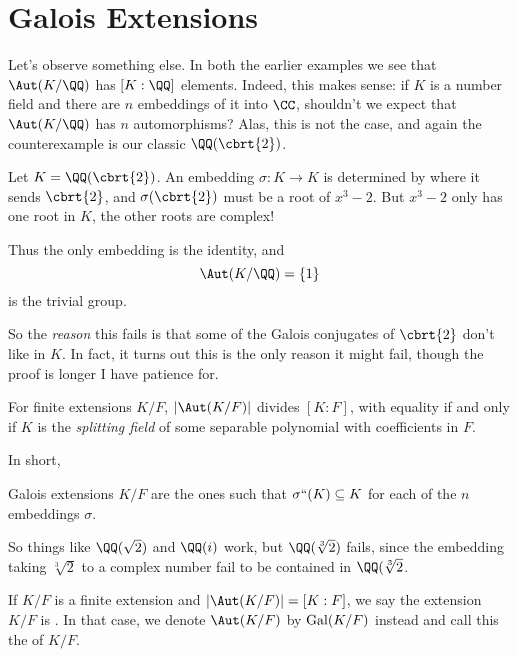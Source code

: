 \section{Galois Extensions}
Let's observe something else.
In both the earlier examples we see that $\Aut(K/\QQ)$ has $[K : \QQ]$ elements.
Indeed, this makes sense: if $K$ is a number field and there are $n$ embeddings of it into $\CC$,
shouldn't we expect that $\Aut(K/\QQ)$ has $n$ automorphisms?
Alas, this is not the case, and again the counterexample is our classic $\QQ(\cbrt{2})$.
\begin{example}
	Let $K = \QQ(\cbrt{2})$.
	An embedding $\sigma : K \to K$ is determined by where it sends $\cbrt{2}$,
	and $\sigma(\cbrt{2})$ must be a root of $x^3-2$.
	But $x^3-2$ only has one root in $K$,
	the other roots are complex!

	Thus the only embedding is the identity, and
	\[ \Aut(K/\QQ) = \{1\} \]
	is the trivial group.
\end{example}
So the \emph{reason} this fails is that some of the Galois conjugates of $\cbrt{2}$
don't like in $K$.
In fact, it turns out this is the only reason it might fail,
though the proof is longer I have patience for.
\begin{theorem}
	For finite extensions $K/F$, 
	$\left\lvert \Aut(K/F) \right\rvert$ divides $[K:F]$,
	with equality if and only if $K$ is the \emph{splitting field}
	of some separable polynomial with coefficients in $F$.
	\label{thm:Galois_splitting}
\end{theorem}
In short,
\begin{moral}
	Galois extensions $K/F$ are the ones such that $\sigma``(K) \subseteq K$
	for each of the $n$ embeddings $\sigma$.
\end{moral}
So things like $\QQ(\sqrt 2)$ and $\QQ(i)$ work, but $\QQ(\sqrt[3]{2})$ fails,
since the embedding taking $\sqrt[3]{2}$ to a complex number fail to be contained in $\QQ(\sqrt[3]{2}$.

\begin{definition}
	If $K/F$ is a finite extension and $\left\lvert \Aut(K/F) \right\rvert = [K:F]$,
	we say the extension $K/F$ is .
	In that case, we denote $\Aut(K/F)$ by $\operatorname{Gal}(K/F)$ instead
	and call this the  of $K/F$.
\end{definition}

